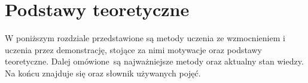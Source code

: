 \chapter{Podstawy teoretyczne}
W poniższym rozdziale przedstawione są metody uczenia ze wzmocnieniem i uczenia przez demonstrację, stojące za nimi motywacje oraz podstawy teoretyczne. Dalej omówione są najważniejsze metody oraz aktualny stan wiedzy. Na końcu znajduje się oraz słownik używanych pojęć.

%








